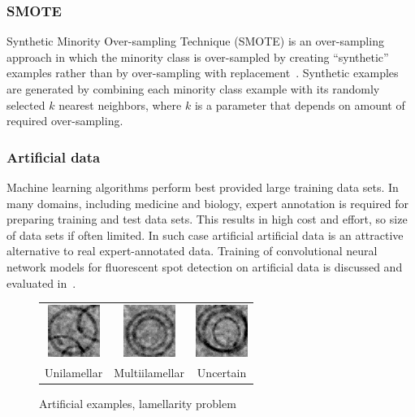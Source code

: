 \documentclass[a4paper, 11pt, table]{article}
\begin{document}
\subsubsection{SMOTE}
Synthetic Minority Over-sampling Technique (SMOTE) is an over-sampling approach in which the minority class is over-sampled by creating “synthetic” examples rather than by over-sampling with replacement~\cite{smote_chawla}. 
Synthetic examples are generated by combining each minority class example with its randomly selected $k$ nearest neighbors, where $k$ is a parameter that depends on amount of required over-sampling.

\subsubsection{Artificial data}
Machine learning algorithms perform best provided large training data sets. In many domains, including medicine and biology, expert annotation is required for preparing training and test data sets. This results in high cost and effort, so size of data sets if often limited. In such case artificial artificial data is an attractive alternative to real expert-annotated data. Training of convolutional neural network models for fluorescent spot detection on artificial data is discussed and evaluated in~\cite{ishaq_synthetic}. 

\begin{figure}[H]
\centering
\begin{tabular}{ccc}
	\includegraphics[scale=1.5]{synthetic/uni.png} & \includegraphics[scale=1.5]{synthetic/multi.png} & \includegraphics[scale=1.5]{synthetic/uncertain.png} \\
	Unilamellar & Multiilamellar & Uncertain \\[6pt]
\end{tabular}
\caption{Artificial examples, lamellarity problem}
\label{fig:synthetic_images}
\end{figure}
\end{document}

